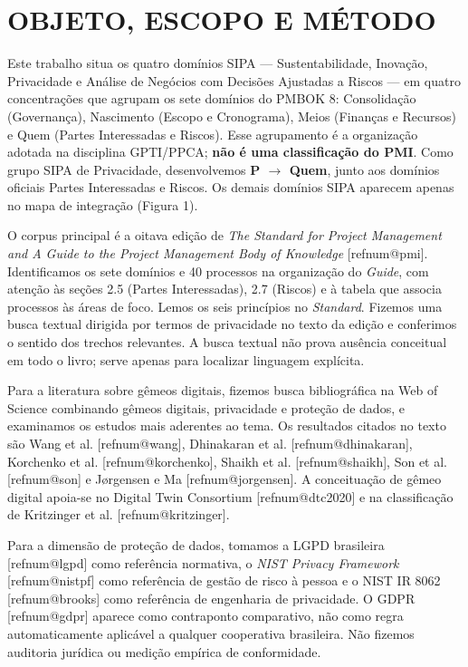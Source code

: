 \documentclass[12pt,a4paper,article,oneside,english,brazil]{abntex2}
\makeatletter
\newcommand{\refnum}[1]{\csname refnum@#1\endcsname}
\makeatother
\begin{document}
\section{OBJETO, ESCOPO E MÉTODO}

Este trabalho situa os quatro domínios SIPA — Sustentabilidade, Inovação, Privacidade e Análise de Negócios com Decisões Ajustadas a Riscos — em quatro concentrações que agrupam os sete domínios do PMBOK 8: Consolidação (Governança), Nascimento (Escopo e Cronograma), Meios (Finanças e Recursos) e Quem (Partes Interessadas e Riscos). Esse agrupamento é a organização adotada na disciplina GPTI/PPCA; \textbf{não é uma classificação do PMI}. Como grupo SIPA de Privacidade, desenvolvemos \textbf{P \ensuremath{\rightarrow} Quem}, junto aos domínios oficiais Partes Interessadas e Riscos. Os demais domínios SIPA aparecem apenas no mapa de integração (Figura 1).

O corpus principal é a oitava edição de \textit{The Standard for Project Management and A Guide to the Project Management Body of Knowledge} [\refnum{pmi}]. Identificamos os sete domínios e 40 processos na organização do \textit{Guide}, com atenção às seções 2.5 (Partes Interessadas), 2.7 (Riscos) e à tabela que associa processos às áreas de foco. Lemos os seis princípios no \textit{Standard}. Fizemos uma busca textual dirigida por termos de privacidade no texto da edição e conferimos o sentido dos trechos relevantes. A busca textual não prova ausência conceitual em todo o livro; serve apenas para localizar linguagem explícita.

Para a literatura sobre gêmeos digitais, fizemos busca bibliográfica na Web of Science combinando gêmeos digitais, privacidade e proteção de dados, e examinamos os estudos mais aderentes ao tema. Os resultados citados no texto são Wang et al. [\refnum{wang}], Dhinakaran et al. [\refnum{dhinakaran}], Korchenko et al. [\refnum{korchenko}], Shaikh et al. [\refnum{shaikh}], Son et al. [\refnum{son}] e Jørgensen e Ma [\refnum{jorgensen}]. A conceituação de gêmeo digital apoia-se no Digital Twin Consortium [\refnum{dtc2020}] e na classificação de Kritzinger et al. [\refnum{kritzinger}].

Para a dimensão de proteção de dados, tomamos a LGPD brasileira [\refnum{lgpd}] como referência normativa, o \textit{NIST Privacy Framework} [\refnum{nistpf}] como referência de gestão de risco à pessoa e o NIST IR 8062 [\refnum{brooks}] como referência de engenharia de privacidade. O GDPR [\refnum{gdpr}] aparece como contraponto comparativo, não como regra automaticamente aplicável a qualquer cooperativa brasileira. Não fizemos auditoria jurídica ou medição empírica de conformidade.
\end{document}
